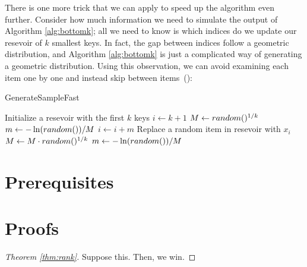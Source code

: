 \documentclass{article}
\begin{document}
There is one more trick that we can apply to speed up the algorithm even further.
Consider how much information we need to simulate the output of Algorithm \ref{alg:bottomk}; all we need to know is which indices do we update our resevoir of $k$ smallest keys.
In fact, the gap between indices follow a geometric distribution, and Algorithm \ref{alg:bottomk} is just a complicated way of generating a geometric distribution.
Using this observation, we can avoid examining each item one by one and instead skip between items~(\cite{li94-12, efraimidis06-03}):
\begin{algorithm}
    \caption{GenerateSampleFast}
    \begin{algorithmic}[1]
            \State Initialize a resevoir with the first $k$ keys
            \State $i \gets k + 1$
            \State $M \gets \mathop{random}()^{1/k}$
            \State $m \gets - \ln( \mathop{random}() ) / M$
                \State $i \gets i + m$
                \State Replace a random item in resevoir with $x_{i}$
                \State $M \gets M \cdot \mathop{random}()^{1/k}$
                \State $m \gets - \ln( \mathop{random}() ) / M$
            \EndWhile
        \EndFunction
    \end{algorithmic}
    \label{alg:samplejumps}
\end{algorithm}

\section{Prerequisites}
\label{sec:prereq}

\section{Proofs}
\label{sec:proofs}

\begin{proof}[Theorem \ref{thm:rank}]
    Suppose this.
    Then, we win.
\end{proof}

\printbibliography
\end{document}
